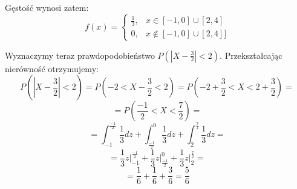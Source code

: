 \documentclass{article}
\begin{document}
Gęstość wynosi zatem:
\begin{equation*}
    f(x) = 
        \begin{cases}
            \frac{1}{3},& x \in [-1, 0] \cup [2, 4]\\
            0,& x \not \in [-1, 0] \cup [2, 4]] 
        \end{cases}
\end{equation*}

Wyznaczymy teraz prawdopodobieństwo \(P(|X - \frac{3}{2}| < 2)\). Przekształcając nierówność otrzymujemy:
\begin{equation*}
    P(|X - \frac{3}{2}| < 2) = P(-2 < X - \frac{3}{2} < 2) = P(-2 + \frac{3}{2} < X < 2 + \frac{3}{2}) =
\end{equation*}
\begin{equation*}
    = P(\frac{-1}{2} < X < \frac{7}{2}) = 
\end{equation*}
\begin{equation*}
    = \int_{-1}^{\frac{-1}{2}} \frac{1}{3} dz + \int_{\frac{-1}{2}}^{0} \frac{1}{3} dz  + \int_{2}^{\frac{7}{2}} \frac{1}{3} dz =
\end{equation*}
\begin{equation*}
    = \frac{1}{3}z \biggr\rvert_{-1}^{\frac{-1}{2}} + \frac{1}{3}z \biggr\rvert_{\frac{-1}{2}}^{0} + \frac{1}{3}z \biggr\rvert_{2}^{\frac{7}{2}} =
\end{equation*}
\begin{equation*}
    = \frac{1}{6} + \frac{1}{6} + \frac{3}{6} = \frac{5}{6}
\end{equation*}
 
\end{document}
